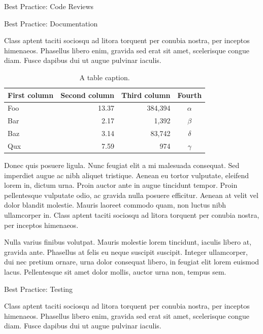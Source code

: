 \documentclass[final]{beamer}
\newlength{\colwidth}
\begin{document}
\begin{frame}[t]
\begin{columns}[t]
\begin{column}{\colwidth}
\begin{block}{Best Practice: Code Reviews}
  \end{block}

  \begin{block}{Best Practice: Documentation}

    Class aptent taciti sociosqu ad litora torquent per conubia nostra, per
    inceptos himenaeos. Phasellus libero enim, gravida sed erat sit amet,
    scelerisque congue diam. Fusce dapibus dui ut augue pulvinar iaculis.

    \begin{table}
      \centering
      \begin{tabular}{l r r c}
        \toprule
        \textbf{First column} & \textbf{Second column} & \textbf{Third column} & \textbf{Fourth} \\
        \midrule
        Foo & 13.37 & 384,394 & $\alpha$ \\
        Bar & 2.17 & 1,392 & $\beta$ \\
        Baz & 3.14 & 83,742 & $\delta$ \\
        Qux & 7.59 & 974 & $\gamma$ \\
        \bottomrule
      \end{tabular}
      \caption{A table caption.}
    \end{table}

    Donec quis posuere ligula. Nunc feugiat elit a mi malesuada consequat. Sed
    imperdiet augue ac nibh aliquet tristique. Aenean eu tortor vulputate,
    eleifend lorem in, dictum urna. Proin auctor ante in augue tincidunt
    tempor. Proin pellentesque vulputate odio, ac gravida nulla posuere
    efficitur. Aenean at velit vel dolor blandit molestie. Mauris laoreet
    commodo quam, non luctus nibh ullamcorper in. Class aptent taciti sociosqu
    ad litora torquent per conubia nostra, per inceptos himenaeos.

    Nulla varius finibus volutpat. Mauris molestie lorem tincidunt, iaculis
    libero at, gravida ante. Phasellus at felis eu neque suscipit suscipit.
    Integer ullamcorper, dui nec pretium ornare, urna dolor consequat libero,
    in feugiat elit lorem euismod lacus. Pellentesque sit amet dolor mollis,
    auctor urna non, tempus sem.

  \end{block}

  \begin{block}{Best Practice: Testing}

    Class aptent taciti sociosqu ad litora torquent per conubia nostra, per
    inceptos himenaeos. Phasellus libero enim, gravida sed erat sit amet,
    scelerisque congue diam. Fusce dapibus dui ut augue pulvinar iaculis.


\end{block}
\end{column}
\end{columns}
\end{frame}
\end{document}
